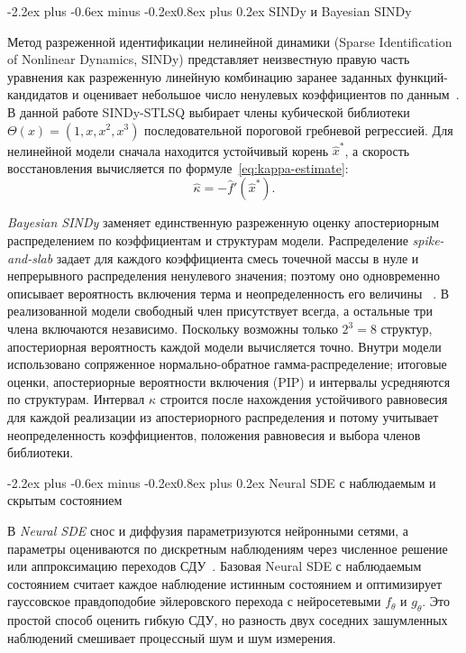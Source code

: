 \documentclass[12pt,a4paper]{article}
\makeatletter
\numberwithin{table}{section}
\numberwithin{figure}{section}
\renewcommand\subsection{\@startsection{subsection}{2}{0pt}
  {-2.2ex plus -0.6ex minus -0.2ex}{0.8ex plus 0.2ex}
  {\normalfont\normalsize\bfseries}}
\newcommand{\term}[1]{\textit{#1}}
\makeatother
\begin{document}
\subsection{SINDy и Bayesian SINDy}

Метод разреженной идентификации нелинейной динамики (Sparse Identification of
Nonlinear Dynamics, SINDy) представляет неизвестную правую часть уравнения как
разреженную линейную комбинацию заранее заданных функций-кандидатов и оценивает
небольшое число ненулевых коэффициентов по данным~\cite{brunton2016}.
В данной работе SINDy-STLSQ выбирает члены кубической библиотеки
$\Theta(x)=(1,x,x^2,x^3)$ последовательной пороговой гребневой регрессией.
Для нелинейной модели сначала находится устойчивый корень $\widehat x^*$, а
скорость восстановления вычисляется по формуле~\eqref{eq:kappa-estimate}:
\begin{equation}
\tag{3.1}
\label{eq:kappa-estimate}
 \widehat\kappa=-\widehat f'(\widehat x^*).
\end{equation}

\term{Bayesian SINDy} заменяет единственную разреженную оценку апостериорным
распределением по коэффициентам и структурам модели. Распределение
\term{spike-and-slab} задает для каждого коэффициента смесь точечной массы в
нуле и непрерывного распределения ненулевого значения; поэтому оно одновременно
описывает вероятность включения терма и неопределенность его величины
~\cite{hirsh2022}. В реализованной модели свободный член присутствует всегда,
а остальные три члена включаются независимо. Поскольку возможны только
$2^3=8$ структур,
апостериорная вероятность каждой модели вычисляется точно. Внутри модели
использовано сопряженное нормально-обратное гамма-распределение; итоговые
оценки, апостериорные вероятности включения (PIP) и интервалы усредняются по
структурам. Интервал $\kappa$ строится после нахождения устойчивого равновесия
для каждой реализации из апостериорного распределения и потому учитывает
неопределенность коэффициентов, положения равновесия и выбора членов
библиотеки.

\subsection{Neural SDE с наблюдаемым и скрытым состоянием}

В \term{Neural SDE} снос и диффузия параметризуются нейронными сетями, а
параметры оцениваются по дискретным наблюдениям через численное решение или
аппроксимацию переходов СДУ~\cite{li2020}. Базовая Neural SDE с наблюдаемым
состоянием считает каждое наблюдение истинным
состоянием и оптимизирует гауссовское правдоподобие эйлеровского перехода с
нейросетевыми $f_\theta$ и $g_\theta$. Это простой способ оценить гибкую СДУ,
но разность двух соседних зашумленных наблюдений смешивает процессный шум и
шум измерения.
\end{document}
